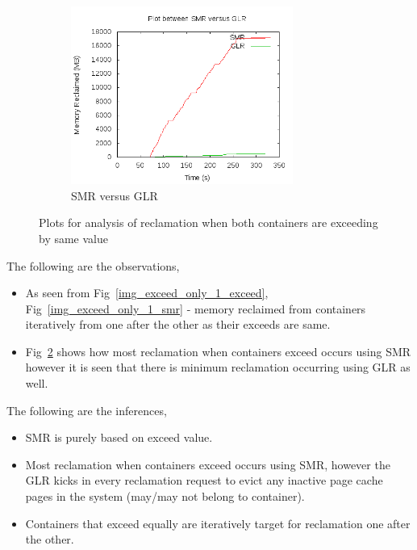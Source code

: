 \begin{figure}[t!]
\begin{subfigure}[t]{0.48\textwidth}
	      \includegraphics[width=0.8\textwidth]{images/controller_issues/exceed_only/compare.png}
	      \caption{SMR versus GLR}
	    \label{img_exceed_only_1_compare}
	    \end{subfigure}
	    \caption{Plots for analysis of reclamation when both containers are exceeding by same value}
	  \end{figure}
	  
	    The following are the observations,
	    \begin{itemize}
	      \item As seen from Fig~\ref{img_exceed_only_1_exceed}, Fig~\ref{img_exceed_only_1_smr} - memory reclaimed from containers 
  iteratively from one after the other as their exceeds are same.
	      \item Fig~\ref{img_exceed_only_1_compare} shows how most reclamation when containers exceed occurs using SMR however it is seen 
  that there is minimum reclamation occurring using GLR as well.
	    \end{itemize}

	    The following are the inferences,
	    \begin{itemize}
	      \item SMR is purely based on exceed value.
	      \item Most reclamation when containers exceed occurs using SMR, however the GLR kicks in every reclamation request to evict any 
  inactive page cache pages in the system (may/may not belong to container).
	      \item Containers that exceed equally are iteratively target for reclamation one after the other.
	    \end{itemize}
      
